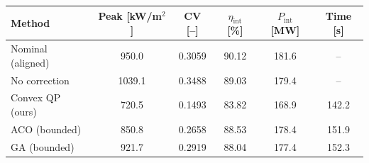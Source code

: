 \begin{tabular}{lccccc}
\toprule
Method & Peak [kW/m$^2$] & CV [--] & $\eta_{\mathrm{int}}$ [\%] & $P_{\mathrm{int}}$ [MW] & Time [s] \\
\midrule
Nominal (aligned) & 950.0 & 0.3059 & 90.12 & 181.6 & -- \\
No correction & 1039.1 & 0.3488 & 89.03 & 179.4 & -- \\
Convex QP (ours) & 720.5 & 0.1493 & 83.82 & 168.9 & 142.2 \\
ACO (bounded) & 850.8 & 0.2658 & 88.53 & 178.4 & 151.9 \\
GA (bounded) & 921.7 & 0.2919 & 88.04 & 177.4 & 152.3 \\
\bottomrule
\end{tabular}

